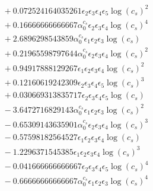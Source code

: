 \documentclass[10pt]{article}
\begin{document}
\begin{align*}
&{}  + 0.072524164035261 \epsilon_{2} \epsilon_{3} \epsilon_{4} \epsilon_{5} \log{\left(c_{s} \right)}^{2} \\
&{}  + 0.16666666666667 \alpha_{0}^{c_s} \epsilon_{2} \epsilon_{3} \epsilon_{4} \log{\left(c_{s} \right)}^{4} \\
&{}  + 2.6896298543859 \alpha_{0}^{c_s} \epsilon_{1} \epsilon_{2} \epsilon_{3} \log{\left(c_{s} \right)} \\
&{}  + 0.21965598797644 \alpha_{0}^{c_s} \epsilon_{2} \epsilon_{3} \epsilon_{4} \log{\left(c_{s} \right)}^{2} \\
&{}  + 0.94917888129267 \epsilon_{1} \epsilon_{2} \epsilon_{3} \epsilon_{4} \log{\left(c_{s} \right)}^{2} \\
&{}  + 0.12160619242309 \epsilon_{2} \epsilon_{3} \epsilon_{4} \epsilon_{5} \log{\left(c_{s} \right)}^{3} \\
&{}  + 0.030669313835717 \epsilon_{2} \epsilon_{3} \epsilon_{4} \epsilon_{5} \log{\left(c_{s} \right)} \\
&{}  - 3.6472716829143 \alpha_{0}^{c_s} \epsilon_{1} \epsilon_{2} \epsilon_{3} \log{\left(c_{s} \right)}^{2} \\
&{}  - 0.65309143635901 \alpha_{0}^{c_s} \epsilon_{2} \epsilon_{3} \epsilon_{4} \log{\left(c_{s} \right)}^{3} \\
&{}  - 0.57598182564527 \epsilon_{1} \epsilon_{2} \epsilon_{3} \epsilon_{4} \log{\left(c_{s} \right)} \\
&{}  - 1.2296371545385 \epsilon_{1} \epsilon_{2} \epsilon_{3} \epsilon_{4} \log{\left(c_{s} \right)}^{3} \\
&{}  - 0.041666666666667 \epsilon_{2} \epsilon_{3} \epsilon_{4} \epsilon_{5} \log{\left(c_{s} \right)}^{4} \\
&{}  - 0.66666666666667 \alpha_{0}^{c_s} \epsilon_{1} \epsilon_{2} \epsilon_{3} \log{\left(c_{s} \right)}^{4}
\end{align*}
\end{document}
